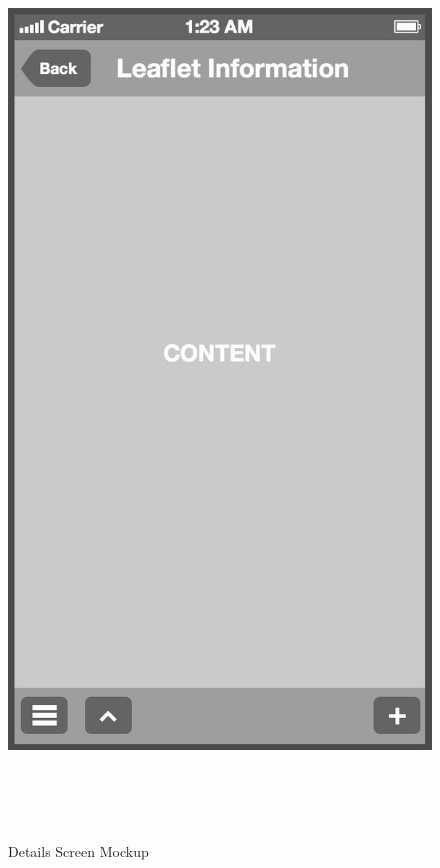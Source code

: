 \begin{figure}[!ptb]
\begin{minipage}[b]{0.45\linewidth}
        \includegraphics[width=0.8025\linewidth]{figures/Screen_4_bw.jpg}
        \caption[Pharmaceutical Details Screen]{Details Screen Mockup}
        \label{fig:DetailsScreen}
    \end{minipage}
    \\
    \\
    \\
    \begin{minipage}[b]{0.45\linewidth}
        \centering

\end{minipage}
\end{figure}

